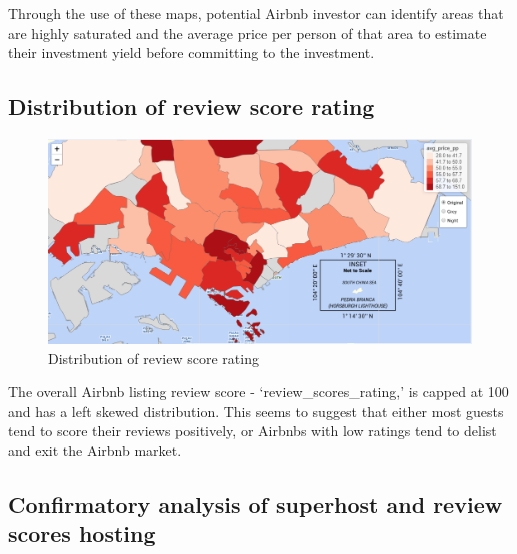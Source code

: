 \documentclass{acm_proc_article-sp}
\begin{document}
Through the use of these maps, potential Airbnb investor can identify
areas that are highly saturated and the average price per person of that
area to estimate their investment yield before committing to the
investment.

\hypertarget{distribution-of-review-score-rating}{%
\subsection{Distribution of review score
rating}\label{distribution-of-review-score-rating}}

\begin{figure}[H]

{\centering \includegraphics[width=1\linewidth]{images/usecase_explore2} 

}

\caption{Distribution of review score rating}\label{fig:unnamed-chunk-18}
\end{figure}

The overall Airbnb listing review score - `review\_scores\_rating,' is
capped at 100 and has a left skewed distribution. This seems to suggest
that either most guests tend to score their reviews positively, or
Airbnbs with low ratings tend to delist and exit the Airbnb market.

\hypertarget{confirmatory-analysis-of-superhost-and-review-scores-hosting}{%
\subsection{Confirmatory analysis of superhost and review scores
hosting}\label{confirmatory-analysis-of-superhost-and-review-scores-hosting}}
\end{document}

